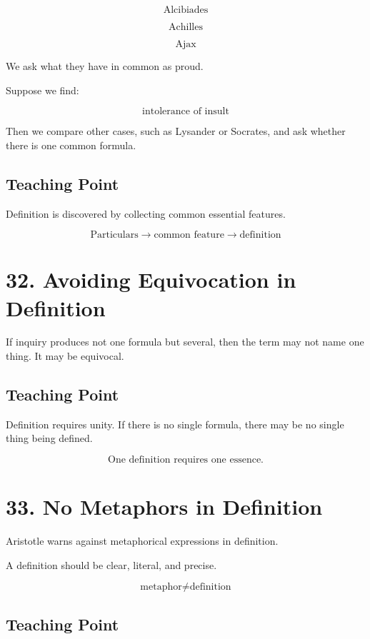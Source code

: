 \documentclass[12pt]{article}
\begin{document}
\[
\text{Alcibiades}
\]

\[
\text{Achilles}
\]

\[
\text{Ajax}
\]

We ask what they have in common as proud.

Suppose we find:

\[
\text{intolerance of insult}
\]

Then we compare other cases, such as Lysander or Socrates, and ask whether
there is one common formula.

\subsection*{Teaching Point}

Definition is discovered by collecting common essential features.

\[
\boxed{
\text{Particulars} \rightarrow \text{common feature} \rightarrow \text{definition}
}
\]

\section*{32. Avoiding Equivocation in Definition}

If inquiry produces not one formula but several, then the term may not name one
thing. It may be equivocal.

\subsection*{Teaching Point}

Definition requires unity. If there is no single formula, there may be no single
thing being defined.

\[
\boxed{
\text{One definition requires one essence.}
}
\]

\section*{33. No Metaphors in Definition}

Aristotle warns against metaphorical expressions in definition.

A definition should be clear, literal, and precise.

\[
\text{metaphor} \neq \text{definition}
\]

\subsection*{Teaching Point}
\end{document}
